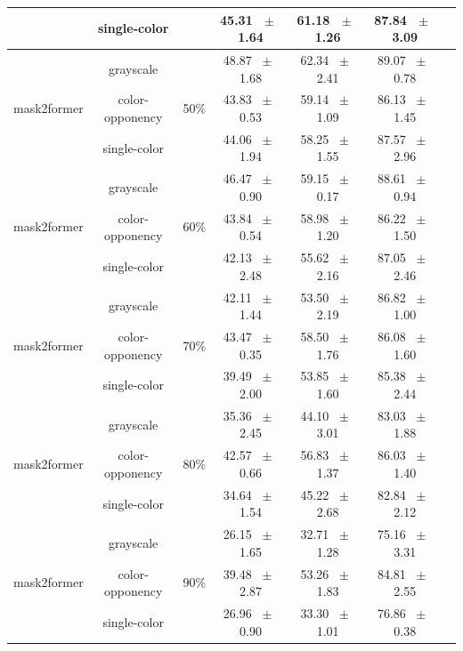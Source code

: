 \begin{table}[h]
\begin{tabular}{@{}lccc ccc@{}}
    & single-color &  & 45.31 ~$\pm$~ 1.64 & 61.18 ~$\pm$~ 1.26 & 87.84 ~$\pm$~ 3.09 \\
    \midrule
    \multirow{3}{*}{mask2former} & grayscale & \multirow{3}{*}{50\%} & 48.87 ~$\pm$~ 1.68 & 62.34 ~$\pm$~ 2.41 & 89.07 ~$\pm$~ 0.78 \\
    & color-opponency &  & 43.83 ~$\pm$~ 0.53 & 59.14 ~$\pm$~ 1.09 & 86.13 ~$\pm$~ 1.45 \\
    & single-color &  & 44.06 ~$\pm$~ 1.94 & 58.25 ~$\pm$~ 1.55 & 87.57 ~$\pm$~ 2.96 \\
    \midrule
    \multirow{3}{*}{mask2former} & grayscale & \multirow{3}{*}{60\%} & 46.47 ~$\pm$~ 0.90 & 59.15 ~$\pm$~ 0.17 & 88.61 ~$\pm$~ 0.94 \\
    & color-opponency &  & 43.84 ~$\pm$~ 0.54 & 58.98 ~$\pm$~ 1.20 & 86.22 ~$\pm$~ 1.50 \\
    & single-color &  & 42.13 ~$\pm$~ 2.48 & 55.62 ~$\pm$~ 2.16 & 87.05 ~$\pm$~ 2.46 \\
    \midrule
    \multirow{3}{*}{mask2former} & grayscale & \multirow{3}{*}{70\%} & 42.11 ~$\pm$~ 1.44 & 53.50 ~$\pm$~ 2.19 & 86.82 ~$\pm$~ 1.00 \\
    & color-opponency &  & 43.47 ~$\pm$~ 0.35 & 58.50 ~$\pm$~ 1.76 & 86.08 ~$\pm$~ 1.60 \\
    & single-color &  & 39.49 ~$\pm$~ 2.00 & 53.85 ~$\pm$~ 1.60 & 85.38 ~$\pm$~ 2.44 \\
    \midrule
    \multirow{3}{*}{mask2former} & grayscale & \multirow{3}{*}{80\%} & 35.36 ~$\pm$~ 2.45 & 44.10 ~$\pm$~ 3.01 & 83.03 ~$\pm$~ 1.88 \\
    & color-opponency &  & 42.57 ~$\pm$~ 0.66 & 56.83 ~$\pm$~ 1.37 & 86.03 ~$\pm$~ 1.40 \\
    & single-color &  & 34.64 ~$\pm$~ 1.54 & 45.22 ~$\pm$~ 2.68 & 82.84 ~$\pm$~ 2.12 \\
    \midrule
    \multirow{3}{*}{mask2former} & grayscale & \multirow{3}{*}{90\%} & 26.15 ~$\pm$~ 1.65 & 32.71 ~$\pm$~ 1.28 & 75.16 ~$\pm$~ 3.31 \\
    & color-opponency &  & 39.48 ~$\pm$~ 2.87 & 53.26 ~$\pm$~ 1.83 & 84.81 ~$\pm$~ 2.55 \\
    & single-color &  & 26.96 ~$\pm$~ 0.90 & 33.30 ~$\pm$~ 1.01 & 76.86 ~$\pm$~ 0.38 \\
    \midrule
    \bottomrule
  \end{tabular}
  \label{tab:sparse_results_mask2former_acdc_rain}
\end{table}